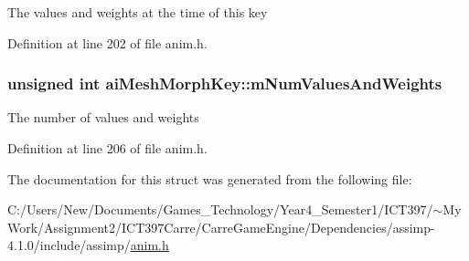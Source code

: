 The values and weights at the time of this key 

Definition at line 202 of file anim.h.\hypertarget{structai_mesh_morph_key_28190ef15ed3535c9ae8dc1c8738a6ed}{
\subsubsection[mNumValuesAndWeights]{\setlength{\rightskip}{0pt plus 5cm}unsigned int {\bf aiMeshMorphKey::mNumValuesAndWeights}}}
\label{structai_mesh_morph_key_28190ef15ed3535c9ae8dc1c8738a6ed}


The number of values and weights 

Definition at line 206 of file anim.h.

The documentation for this struct was generated from the following file:\begin{CompactItemize}
\item 
C:/Users/New/Documents/Games\_\-Technology/Year4\_\-Semester1/ICT397/$\sim$My Work/Assignment2/ICT397Carre/CarreGameEngine/Dependencies/assimp-4.1.0/include/assimp/\hyperlink{anim_8h}{anim.h}\end{CompactItemize}
